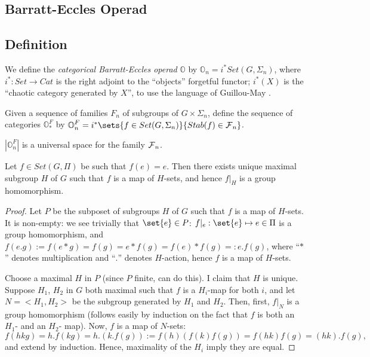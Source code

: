 \documentclass{report}
\begin{document}
\begin{appendices}
\chapter{Barratt-Eccles Operad}
\section{Definition}
\newcommand{\OO}{\text{$\mathbb{O}$}}
We define the {\em categorical Barratt-Eccles operad} $\OO$ by $\OO_n = i^*Set(G,\Sigma_n)$, where $i^*: Set\to Cat$ is the right adjoint to the ``objects'' forgetful functor; $i^*(X)$ is the ``chaotic category generated by $X$'', to use the language of Guillou-May \cite{may_permutative_2014}. 

Given a sequence of families $F_n$ of subgroups of $G\times \Sigma_n$, define the sequence of categories $\OO^F_*$ by $\OO^F_n = i^*\sets{f\in Set(G,\Sigma_n)}{Stab(f)\in \F_n}$. 

\begin{theorem}
  $|\OO_n^F|$ is a universal space for the family $\text{$\mathcal{F}$}_n$. 
\end{theorem}

\begin{lemma}
\label{BElemma1}
  Let $f\in Set(G,\Pi)$ be such that $f(e) = e$. Then there exists unique maximal subgroup $H$ of $G$ such that $f$ is a map of $H$-sets, and hence $f|_H$ is a group homomorphism.
\end{lemma}
\begin{proof}
  Let $P$ be the subposet of subgroups $H$ of $G$ such that $f$ is a map of $H$-sets. It is non-empty: we see trivially that $\set{e}\in P$: $f|_e: \set{e}\mapsto e\in\Pi$ is a group homomorphism, and $f(e.g) := f(e*g) = f(g) = e*f(g) = f(e)*f(g) =: e.f(g)$, where ``$*$'' denotes multiplication and ``$.$'' denotes $H$-action, hence $f$ is a map of $H$-sets.
 
Choose a maximal $H$ in $P$ (since $P$ finite, can do this). I claim that $H$ is unique. Suppose $H_1$, $H_2$ in $G$ both maximal such that $f$ is a $H_i$-map for both $i$, and let $N = <H_1,H_2>$ be the subgroup generated by $H_1$ and $H_2$. Then, first, $f|_N$ is a group homomorphism (follows easily by induction on the fact that $f$ is both an $H_1$- and an $H_2$- map). Now, $f$ is a map of $N$-sets:
\[f(hkg) = h.f(kg) = h.(k.f(g)) := f(h)(f(k)f(g)) = f(hk)f(g) = (hk).f(g),\]
and extend by induction. Hence, maximality of the $H_i$ imply they are equal. 
\end{proof}



\end{appendices}
\end{document}

